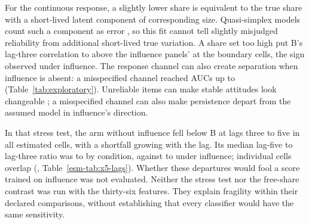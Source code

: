 For the continuous response, a slightly lower share is equivalent to the true share with a short-lived latent component of corresponding size. Quasi-simplex models count such a component as error \cite{saris2014}, so this fit cannot tell slightly misjudged reliability from additional short-lived true variation. A share set  too high put B's lag-three correlation  to  above the influence panels' at the boundary cells, the sign observed under influence. The response channel can also create separation when influence is absent: a misspecified channel reached AUCs up to  (Table~\ref{tab:exploratory}). Unreliable items can make stable attitudes look changeable \cite{achen1975,ansolabehere2008}; a misspecified channel can also make persistence depart from the assumed model in influence's direction.

In that stress test, the arm without influence fell below B at lags three to five in all  estimated cells, with a shortfall growing with the lag. Its median lag-five to lag-three ratio was  to  by condition, against  to  under influence; individual cells overlap (\esmresource, Table~\ref{esm-tab:x5-lags}). Whether these departures would fool a score trained on influence was not evaluated. Neither the stress test nor the free-share contrast was run with the thirty-six features. They explain fragility within their declared comparisons, without establishing that every classifier would have the same sensitivity.

